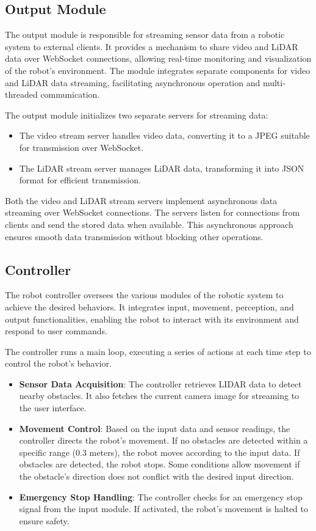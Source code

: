 \documentclass{article}
\begin{document}
\subsection{Output Module}
The output module is responsible for streaming sensor data from a robotic system to external clients. It provides a mechanism to share video and LiDAR data over WebSocket connections, allowing real-time monitoring and visualization of the robot's environment. The module integrates separate components for video and LiDAR data streaming, facilitating asynchronous operation and multi-threaded communication.

The output module initializes two separate servers for streaming data:
\begin{itemize}
    \item The video stream server handles video data, converting it to a JPEG suitable for transmission over WebSocket.
    \item The LiDAR stream server manages LiDAR data, transforming it into JSON format for efficient transmission.
\end{itemize}

Both the video and LiDAR stream servers implement asynchronous data streaming over WebSocket connections. The servers listen for connections from clients and send the stored data when available. This asynchronous approach ensures smooth data transmission without blocking other operations.

\subsection{Controller}
The robot controller oversees the various modules of the robotic system to achieve the desired behaviors. It integrates input, movement, perception, and output functionalities, enabling the robot to interact with its environment and respond to user commands.

The controller runs a main loop, executing a series of actions at each time step to control the robot's behavior.

\begin{itemize}
    \item \textbf{Sensor Data Acquisition}: The controller retrieves LIDAR data to detect nearby obstacles. It also fetches the current camera image for streaming to the user interface.
    \item \textbf{Movement Control}: Based on the input data and sensor readings, the controller directs the robot's movement. If no obstacles are detected within a specific range (0.3 meters), the robot moves according to the input data. If obstacles are detected, the robot stops. Some conditions allow movement if the obstacle's direction does not conflict with the desired input direction.
    \item \textbf{Emergency Stop Handling}: The controller checks for an emergency stop signal from the input module. If activated, the robot's movement is halted to ensure safety.
\end{itemize}
\end{document}
